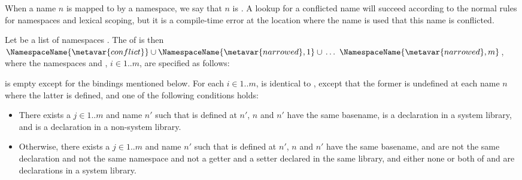\documentclass[makeidx]{article}
\begin{document}
{\LMHash{}%
When a name $n$ is mapped to \ConflictValue{} by a namespace,
we say that $n$ is
.
A lookup for a conflicted name will succeed according to
the normal rules for namespaces and lexical scoping,
but it is a compile-time error at the location where the name is used
that this name is conflicted.

\LMHash{}%
Let  be a list of namespaces
.
The
of  is then
$\NamespaceName{\metavar{conflict}} \cup
\NamespaceName{\metavar{narrowed},1} \cup\,
\ldots\ \NamespaceName{\metavar{narrowed},m}$,
where the namespaces  and
, $i \in 1 .. m$,
are specified as follows:

\LMHash{}%
 is empty except for the
bindings mentioned below.
For each $i \in 1 .. m$,
 is identical to ,
except that the former is undefined at each name $n$ where
the latter is defined,
and one of the following conditions holds:

\begin{itemize}
\item There exists a $j \in 1 .. m$ and name $n'$ such that
   is defined at $n'$,
  $n$ and $n'$ have the same basename,
   is a declaration in a system library,
  and  is a declaration in a non-system library.
\item Otherwise, there exists a $j \in 1 .. m$ and name $n'$ such that
   is defined at $n'$,
  $n$ and $n'$ have the same basename,
   and  are not the same declaration
  and not the same namespace
  and not a getter and a setter declared in the same library,
  and either none or both of
   and 
  are declarations in a system library.


\end{itemize}}
\end{document}

